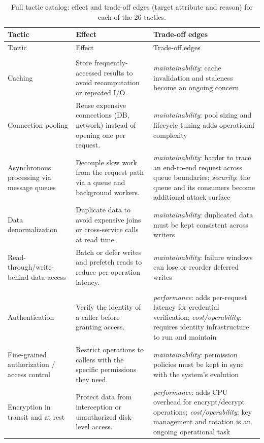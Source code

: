 \documentclass[preprint,12pt,authoryear]{elsarticle}
\renewcommand{\_}{\textunderscore\allowbreak{}}
\begin{document}
{\footnotesize
\setlength{\tabcolsep}{3pt}
\begin{longtable}{@{}>{\raggedright\arraybackslash}p{1.35in}>{\raggedright\arraybackslash}p{1.65in}>{\raggedright\arraybackslash}p{2.22in}@{}}
\caption{Full tactic catalog: effect and trade-off edges (target attribute and reason) for each of the 26 tactics.\label{tab:catalog-full}}\\
\toprule
Tactic & Effect & Trade-off edges \\
\midrule
\endfirsthead
\toprule
Tactic & Effect & Trade-off edges \\
\midrule
\endhead
\bottomrule
\endfoot
\multicolumn{3}{@{}l}{\textbf{Performance}} \\
\midrule
Caching & Store frequently-accessed results to avoid recomputation or repeated I/O. & \emph{maintainability}: cache invalidation and staleness become an ongoing concern \\
Connection pooling & Reuse expensive connections (DB, network) instead of opening one per request. & \emph{maintainability}: pool sizing and lifecycle tuning adds operational complexity \\
Asynchronous processing via message queues & Decouple slow work from the request path via a queue and background workers. & \emph{maintainability}: harder to trace an end-to-end request across queue boundaries; \emph{security}: the queue and its consumers become additional attack surface \\
Data denormalization & Duplicate data to avoid expensive joins or cross-service calls at read time. & \emph{maintainability}: duplicated data must be kept consistent across writers \\
Read-through/write-behind data access & Batch or defer writes and prefetch reads to reduce per-operation latency. & \emph{maintainability}: failure windows can lose or reorder deferred writes \\
\midrule
\multicolumn{3}{@{}l}{\textbf{Security}} \\
\midrule
Authentication & Verify the identity of a caller before granting access. & \emph{performance}: adds per-request latency for credential verification; \emph{cost/operability}: requires identity infrastructure to run and maintain \\
Fine-grained authorization / access control & Restrict operations to callers with the specific permissions they need. & \emph{maintainability}: permission policies must be kept in sync with the system's evolution \\
Encryption in transit and at rest & Protect data from interception or unauthorized disk-level access. & \emph{performance}: adds CPU overhead for encrypt/decrypt operations; \emph{cost/operability}: key management and rotation is an ongoing operational task \\

\end{longtable}}
\end{document}
